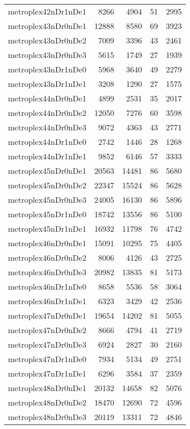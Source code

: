 \begin{longtable}{lrrrr}
metroplex42nDr1nDe1 & 8266 & 4904 & 51 & 2995 \\
metroplex43nDr0nDe1 & 12888 & 8580 & 69 & 3923 \\
metroplex43nDr0nDe2 & 7009 & 3396 & 43 & 2461 \\
metroplex43nDr0nDe3 & 5615 & 1749 & 27 & 1939 \\
metroplex43nDr1nDe0 & 5968 & 3640 & 49 & 2279 \\
metroplex43nDr1nDe1 & 3208 & 1290 & 27 & 1575 \\
metroplex44nDr0nDe1 & 4899 & 2531 & 35 & 2017 \\
metroplex44nDr0nDe2 & 12050 & 7276 & 60 & 3598 \\
metroplex44nDr0nDe3 & 9072 & 4363 & 43 & 2771 \\
metroplex44nDr1nDe0 & 2742 & 1446 & 28 & 1268 \\
metroplex44nDr1nDe1 & 9852 & 6146 & 57 & 3333 \\
metroplex45nDr0nDe1 & 20563 & 14481 & 86 & 5680 \\
metroplex45nDr0nDe2 & 22347 & 15524 & 86 & 5628 \\
metroplex45nDr0nDe3 & 24005 & 16130 & 86 & 5896 \\
metroplex45nDr1nDe0 & 18742 & 13556 & 86 & 5100 \\
metroplex45nDr1nDe1 & 16932 & 11798 & 76 & 4742 \\
metroplex46nDr0nDe1 & 15091 & 10295 & 75 & 4405 \\
metroplex46nDr0nDe2 & 8006 & 4126 & 43 & 2725 \\
metroplex46nDr0nDe3 & 20982 & 13835 & 81 & 5173 \\
metroplex46nDr1nDe0 & 8658 & 5536 & 58 & 3064 \\
metroplex46nDr1nDe1 & 6323 & 3429 & 42 & 2536 \\
metroplex47nDr0nDe1 & 19654 & 14202 & 81 & 5055 \\
metroplex47nDr0nDe2 & 8666 & 4794 & 41 & 2719 \\
metroplex47nDr0nDe3 & 6924 & 2827 & 30 & 2160 \\
metroplex47nDr1nDe0 & 7934 & 5134 & 49 & 2751 \\
metroplex47nDr1nDe1 & 6296 & 3584 & 37 & 2359 \\
metroplex48nDr0nDe1 & 20132 & 14658 & 82 & 5076 \\
metroplex48nDr0nDe2 & 18470 & 12690 & 72 & 4596 \\
metroplex48nDr0nDe3 & 20119 & 13311 & 72 & 4846 \\

\end{longtable}
